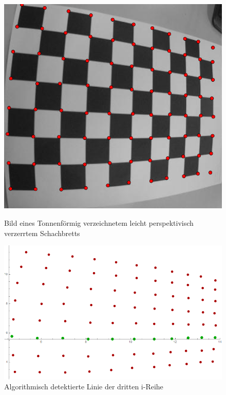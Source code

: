 \begin{figure}[!htb]
	\includegraphics[width=\linewidth]{images/Tonnenverzeichnung_Perspektivisch.png}
	\caption{Bild eines Tonnenförmig verzeichnetem leicht perspektivisch verzerrtem Schachbretts}
	\label{fig:Extreme7}
	\endminipage\hfill
	\includegraphics[width=\linewidth]{images/Tonnenverzeichnung_Perspektivisch_Alg.png}
	\caption{Algorithmisch detektierte Linie der dritten i-Reihe}
	\label{fig:Extreme8}
	\endminipage\hfill
\end{figure}

